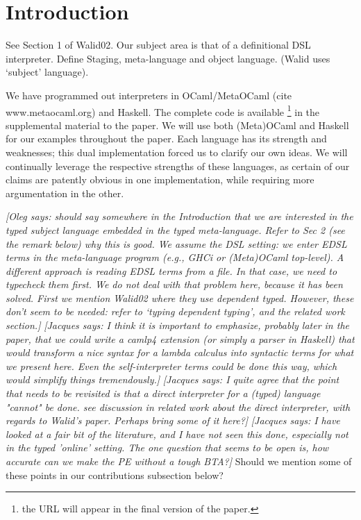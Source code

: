\documentclass[preprint]{sigplanconf}
\newcommand{\jacques}[1]{{\it [Jacques says: #1]}}
\newcommand{\oleg}[1]{{\it [Oleg says: #1]}}
\begin{document}
\section{Introduction}\label{intro}

See Section 1 of Walid02. Our subject area is that of a definitional DSL
interpreter.
Define Staging, meta-language and object language. (Walid uses
`subject' language).

We have programmed out interpreters in OCaml/MetaOCaml (cite
www.metaocaml.org) and Haskell. The complete code is available 
\footnote{the URL will appear in the final version of the paper.}
in the supplemental material to the paper. We will use both
(Meta)OCaml and Haskell for our examples throughout the paper.
Each language has its strength and weaknesses; this dual implementation
forced us to clarify our own ideas.  We will continually leverage the
respective strengths of these languages, as certain of our claims are
patently obvious in one implementation, while requiring more argumentation
in the other.

\oleg{should say somewhere in the Introduction that we are interested
  in the typed subject language embedded in the typed
  meta-language. Refer to Sec 2 (see the remark below) why this is
  good. We assume the DSL setting: we enter EDSL terms in the
  meta-language program (e.g., GHCi or (Meta)OCaml top-level). A
  different approach is reading EDSL terms from a file. In that case, we
  need to typecheck them first. We do not deal with that problem here,
  because it has been solved. First we mention Walid02 where they use
  dependent typed. However, these don't seem to be needed: refer to
  `typing dependent typing', and the related work section.}
\jacques{I think it is important to emphasize, probably later in the 
paper, that we could write a camlp4 extension (or simply a parser in
Haskell) that would transform a nice syntax for a lambda calculus into
syntactic terms for what we present here.  Even the self-interpreter
terms could be done this way, which would simplify things tremendously.}
\jacques{I quite agree that the point that needs to be revisited is
  that a \emph{direct} interpreter for a (typed) language "cannot" be
  done. see discussion in related work about the direct interpreter,
  with regards to Walid's paper. Perhaps bring some of it here?}
\jacques{I have looked at a fair bit of the literature, and I have not
  seen this done, especially not in the typed 'online' setting.  The
  one question that seems to be open is, how accurate can we make the
  PE without a tough BTA?}
Should we mention some of these points in our contributions subsection
below?
\end{document}
